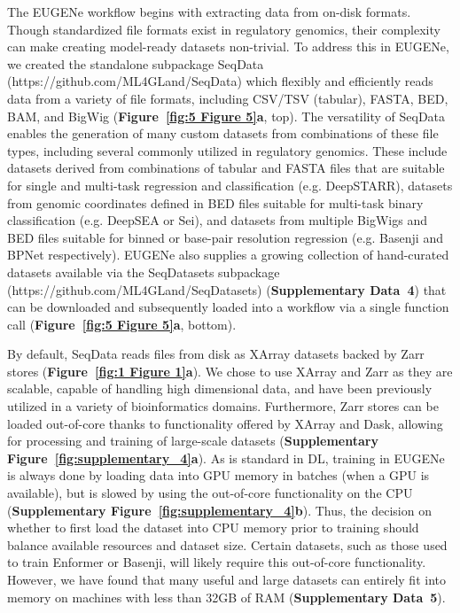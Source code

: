 The EUGENe workflow begins with extracting data from on-disk formats. Though standardized file formats exist in regulatory genomics, their complexity can make creating model-ready datasets non-trivial. To address this in EUGENe, we created the standalone subpackage SeqData (https://github.com/ML4GLand/SeqData) which flexibly and efficiently reads data from a variety of file formats, including CSV/TSV (tabular), FASTA, BED, BAM, and BigWig (\textbf{Figure~\ref{fig:5 Figure 5}\textbf{a}}, top). The versatility of SeqData enables the generation of many custom datasets from combinations of these file types, including several commonly utilized in regulatory genomics. These include datasets derived from combinations of tabular and FASTA files that are suitable for single and multi-task regression and classification (e.g. DeepSTARR\cite{De_Almeida2022-aa}), datasets from genomic coordinates defined in BED files suitable for multi-task binary classification (e.g. DeepSEA\cite{Zhou2015-rk} or Sei\cite{Chen2022-bn}), and datasets from multiple BigWigs and BED files suitable for binned or base-pair resolution regression (e.g. Basenji\cite{Kelley2018-if} and BPNet\cite{Avsec2021-sw} respectively). EUGENe also supplies a growing collection of hand-curated datasets available via the SeqDatasets subpackage (https://github.com/ML4GLand/SeqDatasets) (\textbf{Supplementary Data~4}) that can be downloaded and subsequently loaded into a workflow via a single function call (\textbf{Figure~\ref{fig:5 Figure 5}\textbf{a}}, bottom).

By default, SeqData reads files from disk as XArray datasets\cite{Hoyer2017-jv} backed by Zarr stores\cite{Miles2023-zk} (\textbf{Figure~\ref{fig:1 Figure 1}\textbf{a}}). We chose to use XArray and Zarr as they are scalable, capable of handling high dimensional data, and have been previously utilized in a variety of bioinformatics domains\cite{Baker2023-sp,Marconato2023-kz,Liu2021-km}. Furthermore, Zarr stores can be loaded out-of-core thanks to functionality offered by XArray and Dask\cite{Team2016-qa}, allowing for processing and training of large-scale datasets (\textbf{Supplementary Figure~\ref{fig:supplementary_4}\textbf{a}}). As is standard in DL, training in EUGENe is always done by loading data into GPU memory in batches (when a GPU is available), but is slowed by using the out-of-core functionality on the CPU (\textbf{Supplementary Figure~\ref{fig:supplementary_4}\textbf{b}}). Thus, the decision on whether to first load the dataset into CPU memory prior to training should balance available resources and dataset size. Certain datasets, such as those used to train Enformer\cite{Avsec2021-hh} or Basenji\cite{Kelley2018-if}, will likely require this out-of-core functionality. However, we have found that many useful and large datasets can entirely fit into memory on machines with less than 32GB of RAM (\textbf{Supplementary Data~5}).

